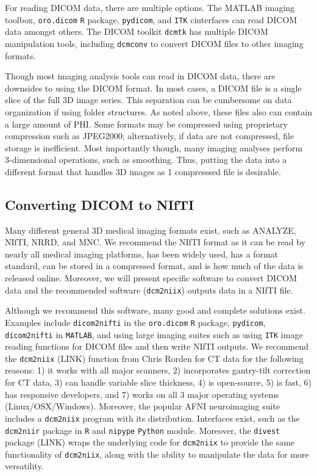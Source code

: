 \documentclass[]{elsarticle} %
\begin{document}
For reading DICOM data, there are multiple options. The MATLAB imaging
toolbox, \texttt{oro.dicom} \texttt{R} package, \texttt{pydicom}, and
\texttt{ITK} cinterfaces can read DICOM data amongst others. The DICOM
toolkit \texttt{dcmtk} has multiple DICOM manipulation tools, including
\texttt{dcmconv} to convert DICOM files to other imaging formats.

Though most imaging analysis tools can read in DICOM data, there are
downsides to using the DICOM format. In most cases, a DICOM file is a
single slice of the full 3D image series. This separation can be
cumbersome on data organization if using folder structures. As noted
above, these files also can contain a large amount of PHI. Some formats
may be compressed using proprietary compression such as JPEG2000;
alternatively, if data are not compressed, file storage is inefficient.
Most importantly though, many imaging analyses perform 3-dimensional
operations, such as smoothing. Thus, putting the data into a different
format that handles 3D images as 1 compresssed file is desirable.

\hypertarget{converting-dicom-to-nifti}{%
\subsection{Converting DICOM to NIfTI}\label{converting-dicom-to-nifti}}

Many different general 3D medical imaging formats exist, such as
ANALYZE, NIfTI, NRRD, and MNC. We recommend the NIfTI format as it can
be read by nearly all medical imaging platforms, has been widely used,
has a format standard, can be stored in a compressed format, and is how
much of the data is released online. Moreover, we will present specific
software to convert DICOM data and the recommended software
(\texttt{dcm2niix}) outputs data in a NIfTI file.

Although we recommend this software, many good and complete solutions
exist. Examples include \texttt{dicom2nifti} in the \texttt{oro.dicom}
\texttt{R} package, \texttt{pydicom}, \texttt{dicom2nifti} in
\texttt{MATLAB}, and using large imaging suites such as using
\texttt{ITK} image reading functions for DICOM files and then write
NIfTI outputs. We recommend the \texttt{dcm2niix} (LINK) function from
Chris Rorden for CT data for the following reasons: 1) it works with all
major scanners, 2) incorporates gantry-tilt correction for CT data, 3)
can handle variable slice thickness, 4) is open-source, 5) is fast, 6)
has responsive developers, and 7) works on all 3 major operating systems
(Linux/OSX/Windows). Moreover, the popular AFNI neuroimaging suite
includes a \texttt{dcm2niix} program with its distribution. Interfaces
exist, such as the \texttt{dcm2niir} package in \texttt{R} and
\texttt{nipype} \texttt{Python} module. Moreover, the \texttt{divest}
package (LINK) wraps the underlying code for \texttt{dcm2niix} to
provide the same functionality of \texttt{dcm2niix}, along with the
ability to manipulate the data for more versatility.
\end{document}
